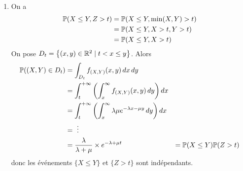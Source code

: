 {\begin{td-sol}[]
\begin{enumerate}
            \item On a
            \begin{equation*}
                \begin{aligned}
                    \mathbb{P}(X\leq Y, Z>t)
                    &= \mathbb{P}(X\leq Y, \min(X,Y)>t)\\
                    &= \mathbb{P}(X\leq Y, X>t, Y>t)\\
                    &= \mathbb{P}(X\leq Y, X>t)\\
                \end{aligned}
            \end{equation*}
            On pose \({D_t} = \left\{ (x,y)\in\mathbb{R}^2 \mid t<x\leq y \right\}\).
            Alors
            \begin{equation*}
                \begin{aligned}
                    \mathbb{P}((X,Y)\in {D_t})
                    &= \int_{D_t} f_{(X,Y)}(x,y)\mathop{}\!{d} x\mathop{}\!{d} y\\
                    &= \int_t^{+\infty} \left(\int_x^{\infty} f_{(X,Y)}(x,y)\mathop{}\!{d} y\right)\mathop{}\!{d} x\\
                    &= \int_t^{+\infty} \left(\int_x^{\infty} \lambda\mu e^{-\lambda x-\mu y}\mathop{}\!{d} y\right)\mathop{}\!{d} x\\
                    &= \ \vdots\\
                    &= \frac{\lambda}{\lambda+\mu} \times e^{-\lambda+\mu t}
                    &= \mathbb{P}(X\leq Y)\mathbb{P}(Z>t) 
                \end{aligned}
            \end{equation*}
            donc les événements \(\{X\leq Y\}\) et \(\{Z>t\}\) sont indépendants.
        \end{enumerate}
    \end{td-sol}
}{}


